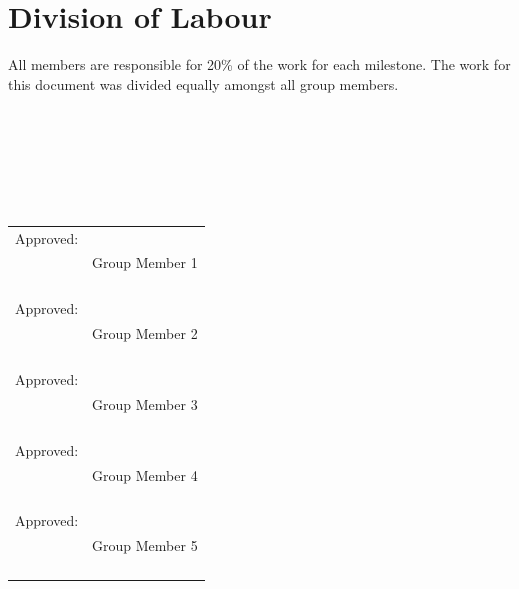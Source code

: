 \documentclass[]{article}
\begin{document}


\appendix
\section{Division of Labour}
\label{sec:division_of_labour}
All members are responsible for 20\% of the work for each milestone.  The work for this document was divided equally amongst all group members.\\
\\\\\\\\\\\\
\begin{tabular}{@{}p{.5in}p{4in}@{}}
Approved: & \hrulefill \\
& Group Member 1 \\\\\\\\\\
Approved: & \hrulefill \\
& Group Member 2 \\\\\\\\\\
Approved: & \hrulefill \\
& Group Member 3 \\\\\\\\\\
Approved: & \hrulefill \\
& Group Member 4 \\\\\\\\\\
Approved: & \hrulefill \\
& Group Member 5 \\\\\\\\\\
\end{tabular}
\end{document}
